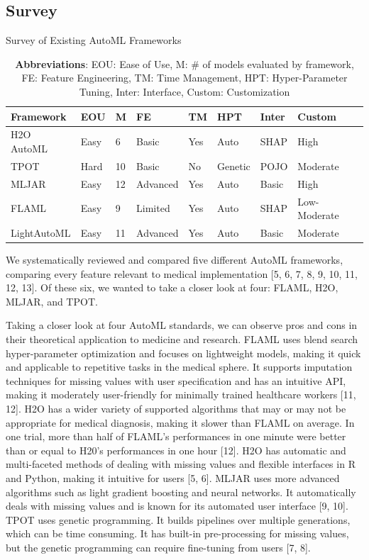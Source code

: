 \documentclass{article}
\begin{document}
\subsection{Survey}

\begin{table}
  \caption{Survey of Existing AutoML Frameworks}
  \label{automl-survey}
  \centering
  \begin{tabular}{lllllllll}
    \toprule
    Framework & EOU & M & FE & TM & HPT & Inter & Custom\\
    \midrule
    H2O AutoML & Easy & 6 & Basic & Yes & Auto & SHAP & High\\
    TPOT & Hard & 10 & Basic & No & Genetic & POJO & Moderate\\
    MLJAR & Easy & 12 & Advanced & Yes & Auto & Basic & High\\
    FLAML & Easy & 9 & Limited & Yes & Auto & SHAP & Low-Moderate\\
    LightAutoML & Easy & 11 & Advanced & Yes & Auto & Basic & Moderate\\
    \bottomrule
  \end{tabular}
  \captionsetup{font=footnotesize}
  \caption*{\textbf{Abbreviations}: EOU: Ease of Use, M: \# of models evaluated by framework, FE: Feature Engineering, TM: Time Management, HPT: Hyper-Parameter Tuning, Inter: Interface, Custom: Customization}
\end{table}
We systematically reviewed and compared five different AutoML frameworks, comparing every feature relevant to medical implementation [5, 6, 7, 8, 9, 10, 11, 12, 13]. Of these six, we wanted to take a closer look at four: FLAML, H2O, MLJAR, and TPOT.

Taking a closer look at four AutoML standards, we can observe pros and cons in their theoretical application to medicine and research. FLAML uses blend search hyper-parameter optimization and focuses on lightweight models, making it quick and applicable to repetitive tasks in the medical sphere. It supports imputation techniques for missing values with user specification and has an intuitive API, making it moderately user-friendly for minimally trained healthcare workers [11, 12]. H2O has a wider variety of supported algorithms that may or may not be appropriate for medical diagnosis, making it slower than FLAML on average. In one trial, more than half of FLAML's performances in one minute were better than or equal to H20's performances in one hour [12]. H2O has automatic and multi-faceted methods of dealing with missing values and flexible interfaces in R and Python, making it intuitive for users [5, 6]. MLJAR uses more advanced algorithms such as light gradient boosting and neural networks. It automatically deals with missing values and is known for its automated user interface [9, 10]. TPOT uses genetic programming. It builds pipelines over multiple generations, which can be time consuming. It has built-in pre-processing for missing values, but the genetic programming can require fine-tuning from users [7, 8].
\end{document}

